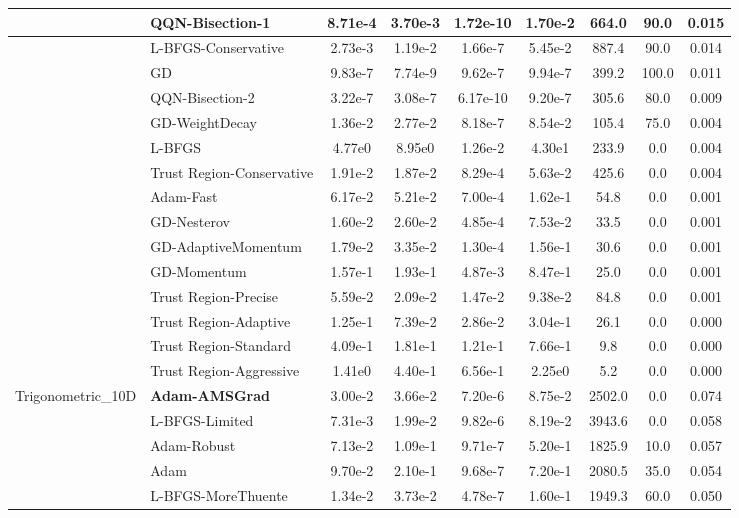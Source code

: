 \documentclass{article}
\begin{document}
\begin{longtable}{|l|l|c|c|c|c|c|c|c|}
\hline
 & QQN-Bisection-1 & 8.71e-4 & 3.70e-3 & 1.72e-10 & 1.70e-2 & 664.0 & 90.0 & 0.015 \\
\hline
 & L-BFGS-Conservative & 2.73e-3 & 1.19e-2 & 1.66e-7 & 5.45e-2 & 887.4 & 90.0 & 0.014 \\
\hline
 & GD & 9.83e-7 & 7.74e-9 & 9.62e-7 & 9.94e-7 & 399.2 & 100.0 & 0.011 \\
\hline
 & QQN-Bisection-2 & 3.22e-7 & 3.08e-7 & 6.17e-10 & 9.20e-7 & 305.6 & 80.0 & 0.009 \\
\hline
 & GD-WeightDecay & 1.36e-2 & 2.77e-2 & 8.18e-7 & 8.54e-2 & 105.4 & 75.0 & 0.004 \\
\hline
 & L-BFGS & 4.77e0 & 8.95e0 & 1.26e-2 & 4.30e1 & 233.9 & 0.0 & 0.004 \\
\hline
 & Trust Region-Conservative & 1.91e-2 & 1.87e-2 & 8.29e-4 & 5.63e-2 & 425.6 & 0.0 & 0.004 \\
\hline
 & Adam-Fast & 6.17e-2 & 5.21e-2 & 7.00e-4 & 1.62e-1 & 54.8 & 0.0 & 0.001 \\
\hline
 & GD-Nesterov & 1.60e-2 & 2.60e-2 & 4.85e-4 & 7.53e-2 & 33.5 & 0.0 & 0.001 \\
\hline
 & GD-AdaptiveMomentum & 1.79e-2 & 3.35e-2 & 1.30e-4 & 1.56e-1 & 30.6 & 0.0 & 0.001 \\
\hline
 & GD-Momentum & 1.57e-1 & 1.93e-1 & 4.87e-3 & 8.47e-1 & 25.0 & 0.0 & 0.001 \\
\hline
 & Trust Region-Precise & 5.59e-2 & 2.09e-2 & 1.47e-2 & 9.38e-2 & 84.8 & 0.0 & 0.001 \\
\hline
 & Trust Region-Adaptive & 1.25e-1 & 7.39e-2 & 2.86e-2 & 3.04e-1 & 26.1 & 0.0 & 0.000 \\
\hline
 & Trust Region-Standard & 4.09e-1 & 1.81e-1 & 1.21e-1 & 7.66e-1 & 9.8 & 0.0 & 0.000 \\
\hline
 & Trust Region-Aggressive & 1.41e0 & 4.40e-1 & 6.56e-1 & 2.25e0 & 5.2 & 0.0 & 0.000 \\
Trigonometric\_10D & \textbf{Adam-AMSGrad} & 3.00e-2 & 3.66e-2 & 7.20e-6 & 8.75e-2 & 2502.0 & 0.0 & 0.074 \\
\hline
 & L-BFGS-Limited & 7.31e-3 & 1.99e-2 & 9.82e-6 & 8.19e-2 & 3943.6 & 0.0 & 0.058 \\
\hline
 & Adam-Robust & 7.13e-2 & 1.09e-1 & 9.71e-7 & 5.20e-1 & 1825.9 & 10.0 & 0.057 \\
\hline
 & Adam & 9.70e-2 & 2.10e-1 & 9.68e-7 & 7.20e-1 & 2080.5 & 35.0 & 0.054 \\
\hline
 & L-BFGS-MoreThuente & 1.34e-2 & 3.73e-2 & 4.78e-7 & 1.60e-1 & 1949.3 & 60.0 & 0.050 \\

\end{longtable}
\end{document}
